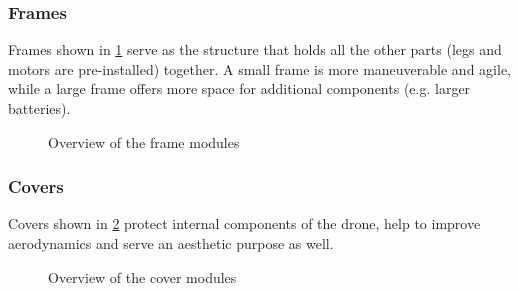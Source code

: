 \documentclass[sigconf,review]{acmart}
\begin{document}
\subsubsection{Frames}
\label{sec:frames}

Frames shown in \cref{fig:frames} serve as the structure that holds all the other parts (legs and motors are pre-installed) together. 
A small frame is more maneuverable and agile, while a large frame offers more space for additional components (e.g. larger batteries).

\begin{figure}[htbp]
    \hfill

    \caption{Overview of the frame modules}
    \label{fig:frames}
\end{figure}

\subsubsection{Covers}
\label{sec:covers}

Covers shown in \cref{fig:atomic-modules} protect internal components of the drone, help to improve aerodynamics and serve an aesthetic purpose as well.

\begin{figure}[htbp]
    
    \hfill
    \caption{Overview of the cover modules}
    \label{fig:atomic-modules}
\end{figure}
\end{document}
